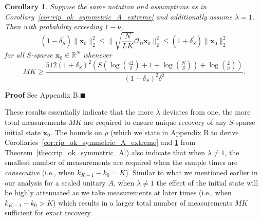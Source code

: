 \documentclass[11pt,draftcls,onecolumn]{IEEEtran}
\def\real    { \mathbb{R} }
\newtheorem{cor}{Corollary}
\def \ok {{\mathcal{O}_{\Omega}}}
\newcommand{\vc}[1]{\boldsymbol{#1}}
\def\real    { \mathbb{R} }
\begin{document}
\begin{cor}
Suppose the same notation and assumptions as in Corollary~\ref{cor:rip_ok_symmetric_A_extreme} and additionally assume $\lambda=1$. Then with probability exceeding $1-\nu$,
\begin{equation}
(1-\delta^{\prime}_S) \|\vc{x}_0\|_2^2 \leq \|\sqrt{\frac{N}{LK}}\ok\vc{x}_0\|_2^2 \leq (1+\delta^{\prime}_S)\|\vc{x}_0\|_2^2
\label{eq:rip_ok_symmetric_A_extreme_1}
\end{equation}
for all $S$-sparse $\vc{x}_0 \in \real^N$ whenever
\begin{equation}
MK \geq \frac{512(1+\delta_S)^2\left(S\left(\log(\frac{42}{\delta})+ 1 + \log(\frac{N}{S})\right) + \log(\frac{2}{\nu})\right)}{(1-\delta_S)^2\delta^2}.
\end{equation}
\label{cor:rip_ok_symmetric_A_extreme_1}
\end{cor}
{\textbf{Proof}} See Appendix B.\hfill $\blacksquare$

These results essentially indicate that the more $\lambda$ deviates from one, the more total measurements $MK$ are required to ensure unique recovery of any $S$-sparse initial state $\vc{x}_0$.
The bounds on $\rho$ (which we state in Appendix B to derive Corollaries~\ref{cor:rip_ok_symmetric_A_extreme} and \ref{cor:rip_ok_symmetric_A_extreme_1} from Theorem~\ref{theo:rip_ok_symmetric_A}) also indicate that when $\lambda \neq 1$, the smallest number of measurements are required when the sample times are {\em consecutive} (i.e., when $k_{K-1}-k_{0}=K$).
Similar to what we mentioned earlier in our analysis for a scaled unitary $A$, when $\lambda \neq 1$ the effect of the initial state will be highly attenuated as we take measurements at later times (i.e., when $k_{K-1}-k_0 > K$) which results in a larger total number of measurements $MK$ sufficient for exact recovery.
\end{document}
